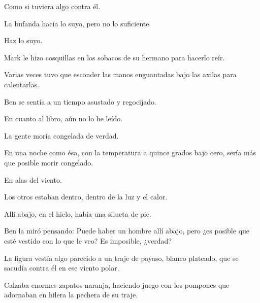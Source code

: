 \sk
Como si tuviera algo contra él.

\sk
La bufanda hacía lo suyo, pero no lo suficiente.

\sk
Haz lo suyo. 

\sk
Mark le hizo cosquillas en los sobacos de su hermano para hacerlo reír.

\sk
Varias veces tuvo que
esconder las manos enguantadas bajo las axilas
para calentarlas.

\sk
Ben se sentía a un tiempo asustado y regocijado.

\sk
En cuanto al libro, aún no lo he leído.

\sk
La gente moría congelada de verdad.

\sk
En una noche como ésa, con la
temperatura a quince grados bajo cero, sería más
que posible morir congelado.

\sk
En alas del viento. 

\sk
Los otros estaban dentro, dentro de la luz y el calor.

\sk
Allí abajo, en el hielo, había una silueta de pie.

\sk
Ben la miró pensando: Puede haber un hombre
allí abajo, pero ¿es posible que esté vestido con
lo que le veo? Es imposible, ¿verdad?

\sk
La figura vestía algo parecido a un traje de
payaso, blanco plateado, que se sacudía contra él
en ese viento polar.

\sk
Calzaba enormes zapatos
naranja, haciendo juego con los pompones que
adornaban en hilera la pechera de su traje.

